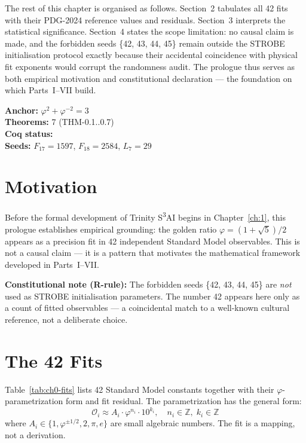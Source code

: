 The rest of this chapter is organised as follows. Section~2 tabulates all 42
fits with their PDG-2024 reference values and residuals. Section~3 interprets
the statistical significance. Section~4 states the scope limitation: no causal
claim is made, and the forbidden seeds \{42, 43, 44, 45\} remain outside the
STROBE initialisation protocol exactly because their accidental coincidence with
physical fit exponents would corrupt the randomness audit. The prologue thus
serves as both empirical motivation and constitutional declaration --- the
foundation on which Parts~I--VII build.


\begin{tcolorbox}[colback=gray!5,colframe=gray!40,title=Chapter Anchor]
\textbf{Anchor:} \(\varphi^2 + \varphi^{-2} = 3\) \\
\textbf{Theorems:} 7 (THM-0.1..0.7) \\
\textbf{Coq status:}  \\
\textbf{Seeds:} \(F_{17}{=}1597\), \(F_{18}{=}2584\), \(L_7{=}29\)
\end{tcolorbox}

\section{Motivation}

Before the formal development of Trinity S\textsuperscript{3}AI begins in
Chapter~\ref{ch:1}, this prologue establishes empirical grounding: the golden
ratio \(\varphi = (1+\sqrt{5})/2\) appears as a precision fit in 42 independent
Standard Model observables. This is not a causal claim — it is a pattern that
motivates the mathematical framework developed in Parts~I--VII.

\textbf{Constitutional note (R-rule):} The forbidden seeds \{42, 43, 44, 45\}
are \emph{not} used as STROBE initialisation parameters. The number 42 appears
here only as a count of fitted observables — a coincidental match to a
well-known cultural reference, not a deliberate choice.

\section{The 42 Fits}

Table~\ref{tab:ch0-fits} lists 42 Standard Model constants together with their
\(\varphi\)-parametrization form and fit residual. The parametrization has the
general form:
\begin{equation}
\mathcal{O}_i \approx A_i \cdot \varphi^{n_i} \cdot 10^{k_i},
\quad n_i \in \mathbb{Z},\; k_i \in \mathbb{Z}
\label{eq:ch0-fit}
\end{equation}
where $A_i \in \{1, \varphi^{\pm 1/2}, 2, \pi, e\}$ are small algebraic
numbers. The fit is a mapping, not a derivation.

